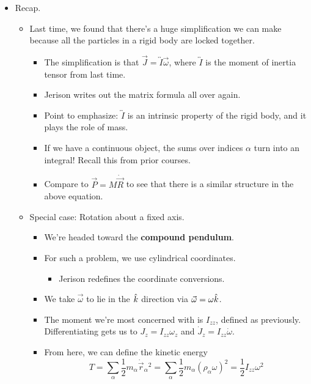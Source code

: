 \documentclass[../notes.tex]{subfiles}
\begin{document}
\begin{itemize}
    \item Recap.
    \begin{itemize}
        \item Last time, we found that there's a huge simplification we can make because all the particles in a rigid body are locked together.
        \begin{itemize}
            \item The simplification is that $\vec{J}=\overleftrightarrow{I}\vec{\omega}$, where $\overleftrightarrow{I}$ is the moment of inertia tensor from last time.
            \item Jerison writes out the matrix formula all over again.
            \item Point to emphasize: $\overleftrightarrow{I}$ is an intrinsic property of the rigid body, and it plays the role of mass.
            \item If we have a continuous object, the sums over indices $\alpha$ turn into an integral! Recall this from prior courses.
            \item Compare to $\vec{P}=M\dot{\vec{R}}$ to see that there is a similar structure in the above equation.
        \end{itemize}
        \item Special case: Rotation about a fixed axis.
        \begin{itemize}
            \item We're headed toward the \textbf{compound pendulum}.
            \item For such a problem, we use cylindrical coordinates.
            \begin{itemize}
                \item Jerison redefines the coordinate conversions.
            \end{itemize}
            \item We take $\vec{\omega}$ to lie in the $\hat{k}$ direction via $\vec{\omega}=\omega\hat{k}$.
            \item The moment we're most concerned with is $I_{zz}$, defined as previously. Differentiating gets us to $J_z=I_{zz}\omega_z$ and $\dot{J}_z=I_{zz}\dot{\omega}$.
            \item From here, we can define the kinetic energy
            \begin{equation*}
                T = \sum_\alpha\frac{1}{2}m_\alpha\dot{\vec{r}}_\alpha{}^2
                = \sum_\alpha\frac{1}{2}m_\alpha(\rho_\alpha\omega)^2
                = \frac{1}{2}I_{zz}\omega^2

\end{equation*}
\end{itemize}
\end{itemize}
\end{itemize}
\end{document}
